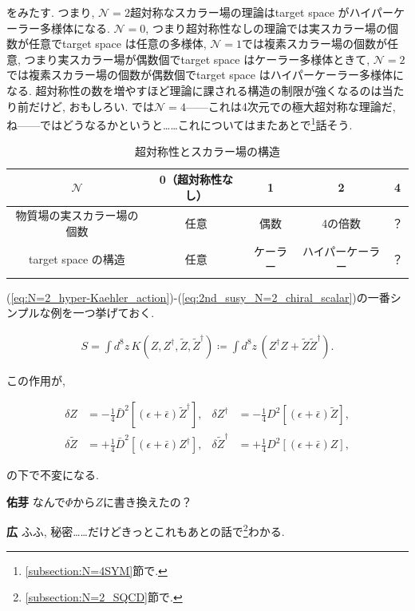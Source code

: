 \documentclass{ltjsarticle}
\theoremstyle{definition}
\newcommand{\parno}{\par\noindent}
\begin{document}
をみたす. つまり, $\mathcal N=2$超対称なスカラー場の理論はtarget space がハイパーケーラー多様体になる. $\mathcal N=0$, つまり超対称性なしの理論では実スカラー場の個数が任意でtarget space は任意の多様体, $\mathcal N=1$では複素スカラー場の個数が任意, つまり実スカラー場が偶数個でtarget space はケーラー多様体ときて, $\mathcal N=2$では複素スカラー場の個数が偶数個でtarget space はハイパーケーラー多様体になる. 超対称性の数を増やすほど理論に課される構造の制限が強くなるのは当たり前だけど, おもしろい. では$\mathcal N=4$------これは4次元での極大超対称な理論だ, ね------ではどうなるかというと……これについてはまたあとで\footnote{\ref{subsection:N=4SYM}節で.}話そう.
\begin{table}[h]
  \centering
  \caption{超対称性とスカラー場の構造}
  \label{tab:susy_scalar_structure}
  \begin{tabular}{c|cccc}
    \hline\hline
   $\mathcal N$&0（超対称性なし）&1&2&4 \\
   \hline\hline
   物質場の実スカラー場の個数&任意&偶数&4の倍数&？\\
   \hline
   target space の構造&任意&ケーラー&ハイパーケーラー&？\\
   \hline\hline
\end{tabular}
\end{table}
\par
(\ref{eq:N=2_hyper-Kaehler_action})-(\ref{eq:2nd_susy_N=2_chiral_scalar})の一番シンプルな例を一つ挙げておく.
\begin{tcolorbox}
\begin{align}
  S=\int d^8z\,K(Z,Z^\dagger,\tilde Z,\tilde Z^\dagger)\coloneqq\int d^8z\,\left(Z^\dagger Z+\tilde Z\tilde Z^\dagger\right).\label{eq:n=2_minimal_matter_lagrangian}
\end{align}
\end{tcolorbox}
\parno
この作用が,
\begin{tcolorbox}
\begin{align}
\delta Z&=-\frac14\bar D^2\left[(\epsilon+\bar\epsilon)\tilde Z^\dagger\right],& \delta Z^\dagger&=-\frac14D^2\left[(\epsilon+\bar\epsilon)\tilde Z\right],\label{eq:n=2_matter_2nd_susy1}\\
\delta\tilde Z&=+\frac14\bar D^2\left[(\epsilon+\bar\epsilon)Z^\dagger \right],&\delta\tilde Z^\dagger&=+\frac14D^2\left[(\epsilon+\bar\epsilon)Z\right],\label{eq:n=2_matter_2nd_susy2}
\end{align}
\end{tcolorbox}
\parno
の下で不変になる.\parno
\textbf{佑芽} なんで$\Phi$から$Z$に書き換えたの？\parno
\textbf{広} ふふ, 秘密……だけどきっとこれもあとの話で\footnote{\ref{subsection:N=2_SQCD}節で.}わかる.\par
\end{document}
